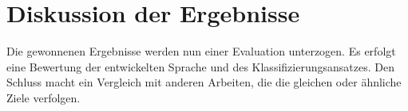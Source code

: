 \chapter{Diskussion der Ergebnisse}
    \label{chapter:FindingsDiscussion}
    Die gewonnenen Ergebnisse
    werden nun einer Evaluation unterzogen.
    Es erfolgt eine Bewertung der entwickelten Sprache
    und des Klassifizierungsansatzes.
    Den Schluss macht ein Vergleich mit anderen Arbeiten,
    die die gleichen oder ähnliche Ziele verfolgen.

    
    
